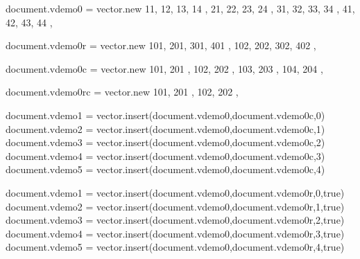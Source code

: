 \startbuffer
\startluacode
document.vdemo0 = vector.new {
    { 11, 12, 13, 14 },
    { 21, 22, 23, 24 },
    { 31, 32, 33, 34 },
    { 41, 42, 43, 44 },
}

document.vdemo0r = vector.new {
    { 101, 201, 301, 401 },
    { 102, 202, 302, 402 },
}

document.vdemo0c = vector.new {
    { 101, 201 },
    { 102, 202 },
    { 103, 203 },
    { 104, 204 },
}

document.vdemo0rc = vector.new {
    { 101, 201 },
    { 102, 202 },
}
\stopluacode
\stopbuffer

\typebuffer[option=TEX] \getbuffer

\startlinecorrection
{}   {}
    {}  {}
    {}  {}
    {} {}
\stopcombination
\stoplinecorrection

\startbuffer
\startluacode
document.vdemo1 = vector.insert(document.vdemo0,document.vdemo0c,0)
document.vdemo2 = vector.insert(document.vdemo0,document.vdemo0c,1)
document.vdemo3 = vector.insert(document.vdemo0,document.vdemo0c,2)
document.vdemo4 = vector.insert(document.vdemo0,document.vdemo0c,3)
document.vdemo5 = vector.insert(document.vdemo0,document.vdemo0c,4)
\stopluacode
\stopbuffer

\typebuffer[option=TEX] \getbuffer

\startlinecorrection
{} {}
    {} {}
    {} {}
    {} {}
    {} {}
\stopcombination
\stoplinecorrection

\startbuffer
\startluacode
document.vdemo1 = vector.insert(document.vdemo0,document.vdemo0r,0,true)
document.vdemo2 = vector.insert(document.vdemo0,document.vdemo0r,1,true)
document.vdemo3 = vector.insert(document.vdemo0,document.vdemo0r,2,true)
document.vdemo4 = vector.insert(document.vdemo0,document.vdemo0r,3,true)
document.vdemo5 = vector.insert(document.vdemo0,document.vdemo0r,4,true)
\stopluacode
\stopbuffer

\typebuffer[option=TEX] \getbuffer

\startlinecorrection
{} {}
    {} {}
    {} {}
    {} {}
    {} {}
\stopcombination
\stoplinecorrection

